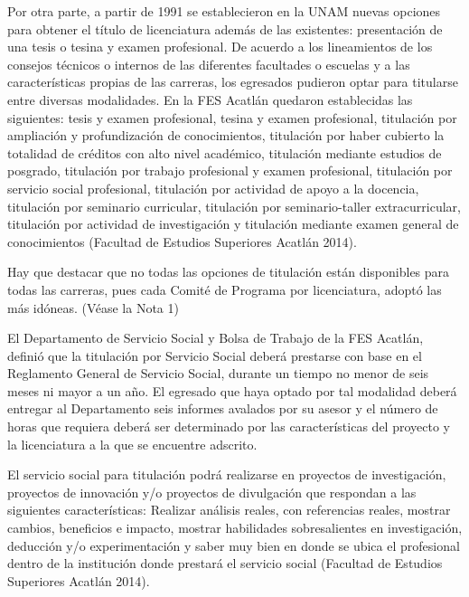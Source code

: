 Por otra parte, a partir de 1991 se establecieron en la UNAM nuevas opciones
para obtener el título de licenciatura además de las existentes:
presentación de una tesis o tesina y examen profesional. De acuerdo a los
lineamientos de los consejos técnicos o internos de las diferentes
facultades o escuelas y a las características propias de las carreras, los
egresados pudieron optar para titularse entre diversas modalidades. En la
FES Acatlán quedaron establecidas las siguientes: tesis y examen
profesional, tesina y examen profesional, titulación por ampliación y
profundización de conocimientos, titulación por haber cubierto la totalidad
de créditos con alto nivel académico, titulación mediante estudios de
posgrado, titulación por trabajo profesional y examen profesional,
titulación por servicio social profesional, titulación por actividad de
apoyo a la docencia, titulación por seminario curricular, titulación por
seminario-taller extracurricular, titulación por actividad de investigación
y titulación mediante examen general de conocimientos (Facultad de Estudios
Superiores Acatlán 2014).

\enlargethispage{1\baselineskip}
Hay que destacar que no todas las opciones de titulación están disponibles
para todas las carreras, pues  cada Comité de Programa por licenciatura,
adoptó las más idóneas. (Véase la Nota 1)

\begin{sloppypar}
El Departamento de Servicio Social y Bolsa de Trabajo de la FES Acatlán,
definió que la titulación por Servicio Social deberá prestarse con base en
el Reglamento General de Servicio Social, durante un tiempo no menor de
seis meses ni mayor a un año. El egresado que haya optado por tal modalidad
deberá entregar al Departamento seis informes avalados por su asesor y el
número de horas que requiera deberá ser determinado por las características
del proyecto y la licenciatura a la que se encuentre adscrito.
\end{sloppypar}

El servicio social para titulación podrá realizarse en proyectos de
investigación, proyectos de innovación y\slash{}o proyectos de divulgación que
respondan a las siguientes características: Realizar análisis reales, con
referencias reales, mostrar cambios, beneficios e impacto, mostrar
habilidades sobresalientes en investigación, deducción y\slash{}o experimentación
y saber muy bien en donde se ubica el profesional dentro de la institución
donde prestará el servicio social (Facultad de Estudios Superiores Acatlán
2014).

